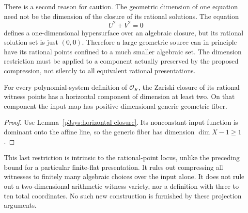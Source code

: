 There is a second reason for caution.  The geometric dimension of
one equation need not be the dimension of the closure of its rational
solutions.  The equation
\[
                         U^2+V^2=0
\]
defines a one-dimensional hypersurface over an algebraic closure,
but its rational solution set is just $(0,0)$.  Therefore a large
geometric source can in principle have its rational points confined
to a much smaller algebraic set.  The dimension restriction must
be applied to a component actually preserved by the proposed
compression, not silently to all equivalent rational presentations.

\begin{corollary}\label{p3sys:arithmetic-dimension-floor}
For every polynomial-system definition of $\mathcal O_K$, the
Zariski closure of its rational witness points has a horizontal
component of dimension at least two.  On that component the input
map has positive-dimensional generic geometric fiber.
\end{corollary}
\begin{proof}
Use Lemma~\ref{p3sys:horizontal-closure}.  Its nonconstant input
function is dominant onto the affine line, so the generic fiber
has dimension $\dim X-1\ge1$.
\end{proof}

This last restriction is intrinsic to the rational-point locus,
unlike the preceding bound for a particular finite-flat presentation.
It rules out compressing all witnesses to finitely many algebraic
choices over the input alone.  It does not rule out a two-dimensional
arithmetic witness variety, nor a definition with three to ten total
coordinates.  No such new construction is furnished by these
projection arguments.
